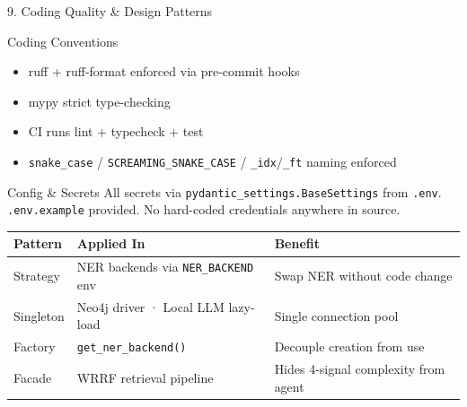 \documentclass[aspectratio=169]{beamer}
\begin{document}
\begin{frame}[shrink=5]{9. Coding Quality \& Design Patterns}
\begin{block}{Coding Conventions \checkmark}
\begin{itemize}\setlength\itemsep{1pt}\small
  \item ruff + ruff-format enforced via pre-commit hooks
  \item mypy strict type-checking
  \item CI runs lint + typecheck + test
  \item \texttt{snake\_case} / \texttt{SCREAMING\_SNAKE\_CASE} / \texttt{\_idx}/\texttt{\_ft} naming enforced
\end{itemize}
\end{block}

\begin{exampleblock}{Config \& Secrets \checkmark}
{\small All secrets via \texttt{pydantic\_settings.BaseSettings} from \texttt{.env}.
\texttt{.env.example} provided. No hard-coded credentials anywhere in source.}
\end{exampleblock}

\begin{tabular}{@{}llp{4.5cm}@{}}
\toprule
\textbf{Pattern} & \textbf{Applied In} & \textbf{Benefit} \\
\midrule
Strategy  & NER backends via \texttt{NER\_BACKEND} env & Swap NER without code change \\
Singleton & Neo4j driver · Local LLM lazy-load         & Single connection pool \\
Factory   & \texttt{get\_ner\_backend()}                & Decouple creation from use \\
Facade    & WRRF retrieval pipeline                    & Hides 4-signal complexity from agent \\
\bottomrule
\end{tabular}
\end{frame}
\end{document}
